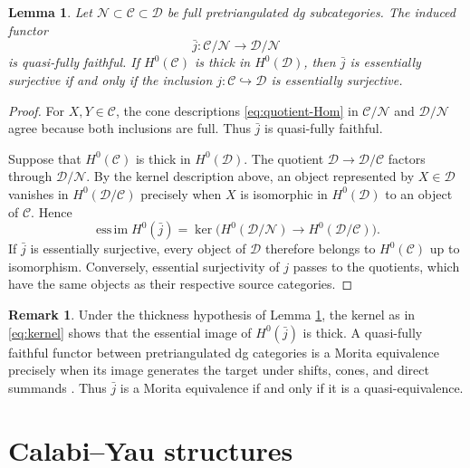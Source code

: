 \documentclass[11pt,letterpaper,reqno]{amsart}
\theoremstyle{plain}
\newtheorem{lemma}[lemma]{Lemma}
\theoremstyle{definition}
\newtheorem{remark}[remark]{Remark}
\theoremstyle{plain}
\theoremstyle{definition}
\numberwithin{equation}{section}
\begin{document}
\begin{lemma}\label{lem:quotient-density}
Let $\mathscr N\subset\mathscr C\subset\mathscr D$ be full pretriangulated dg subcategories.
The induced functor
\[
\bar j:\mathscr C/\mathscr N\longrightarrow\mathscr D/\mathscr N
\]
is quasi-fully faithful.
If $H^0(\mathscr C)$ is thick in $H^0(\mathscr D)$, then $\bar j$ is essentially surjective if and only if the inclusion $j:\mathscr C\hookrightarrow\mathscr D$ is essentially surjective.
\end{lemma}
\begin{proof}
For $X,Y\in\mathscr C$, the cone descriptions \eqref{eq:quotient-Hom} in $\mathscr C/\mathscr N$ and $\mathscr D/\mathscr N$ agree because both inclusions are full.
Thus $\bar j$ is quasi-fully faithful.

Suppose that $H^0(\mathscr C)$ is thick in $H^0(\mathscr D)$.
The quotient $\mathscr D\to\mathscr D/\mathscr C$ factors through $\mathscr D/\mathscr N$.
By the kernel description above, an object represented by $X\in\mathscr D$ vanishes in $H^0(\mathscr D/\mathscr C)$ precisely when $X$ is isomorphic in $H^0(\mathscr D)$ to an object of $\mathscr C$.
Hence
\begin{equation}\label{eq:kernel}
\operatorname{ess\,im}H^0(\bar j)
=\ker\bigl(H^0(\mathscr D/\mathscr N)\longrightarrow H^0(\mathscr D/\mathscr C)\bigr).
\end{equation}
If $\bar j$ is essentially surjective, every object of $\mathscr D$ therefore belongs to $H^0(\mathscr C)$ up to isomorphism.
Conversely, essential surjectivity of $j$ passes to the quotients, which have the same objects as their respective source categories.
\end{proof}

\begin{remark}
Under the thickness hypothesis of Lemma \ref{lem:quotient-density}, the kernel as in \eqref{eq:kernel} shows that the essential image of $H^0(\bar j)$ is thick.
A quasi-fully faithful functor between pretriangulated dg categories is a Morita equivalence precisely when its image generates the target under shifts, cones, and direct summands \cite[Lemma 3.10]{Keller2006b}.
Thus $\bar j$ is a Morita equivalence if and only if it is a quasi-equivalence.
\end{remark}




\section{Calabi--Yau structures}\label{sec:calabi-yau}
\end{document}
